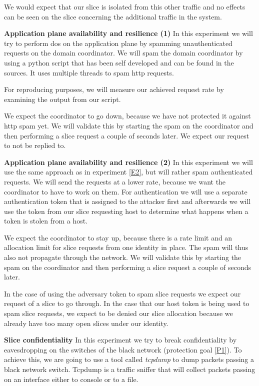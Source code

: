 \begin{description}[style=multiline, labelwidth=0.7cm]
    We would expect that our slice is isolated from this other traffic and no effects can be seen on the slice concerning the additional traffic in the system.

    \item[\namedlabel{E2}{E2}] \textbf{Application plane availability and resilience (1)} In this experiment we will try to perform \acrshort{dos} on the application plane by spamming unauthenticated requests on the domain coordinator. We will spam the domain coordinator by using a python script that has been self developed and can be found in the sources. It uses multiple threads to spam http requests.

    For reproducing purposes, we will measure our achieved request rate by examining the output from our script.

    We expect the coordinator to go down, because we have not protected it against http spam yet. We will validate this by starting the spam on the coordinator and then performing a slice request a couple of seconds later. We expect our request to not be replied to.

    \item[\namedlabel{E3}{E3}] \textbf{Application plane availability and resilience (2)} In this experiment we will use the same approach as in experiment \ref{E2}, but will rather spam authenticated requests. We will send the requests at a lower rate, because we want the coordinator to have to work on them. For authentication we will use a separate authentication token that is assigned to the attacker first and afterwards we will use the token from our slice requesting host to determine what happens when a token is stolen from a host.

    We expect the coordinator to stay up, because there is a rate limit and an allocation limit for slice requests from one identity in place. The spam will thus also not propagate through the network. We will validate this by starting the spam on the coordinator and then performing a slice request a couple of seconds later.

    In the case of using the adversary token to spam slice requests we expect our request of a slice to go through. In the case that our host token is being used to spam slice requests, we expect to be denied our slice allocation because we already have too many open slices under our identity.

    \item[\namedlabel{E4}{E4}] \textbf{Slice confidentiality} In this experiment we try to break confidentiality by eavesdropping on the switches of the black network (protection goal \ref{P1}). To achieve this, we are going to use a tool called \textit{tcpdump} \cite{tcpdump} to dump packets passing a black network switch. Tcpdump is a traffic sniffer that will collect packets passing on an interface either to console or to a file.


\end{description}
